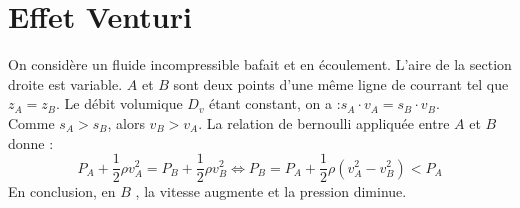 \section{Effet Venturi}


On considère un fluide incompressible bafait et en écoulement. L'aire de la section droite est variable. \( A\) et \(B\) sont deux points d'une même ligne de courrant tel que \(z_{A} = z_{B}\). Le débit volumique \(D_{v}\) étant constant, on a :\(s_{A} \cdot v_{A} = s_{B} \cdot v_{B}\).\\
Comme \(s_{A}>s_{B}\), alors \(v_{B}>v_{A}\). La relation de bernoulli appliquée entre \(A\) et \(B\) donne : \\
\[
    P_{A} +\frac{1}{2}\rho v_{A}^{2} = P_{B} +\frac{1}{2}\rho v_{B}^{2} \iff P_{B} = P_{A} + \frac{1}{2}\rho (v_{A}^{2} - v_{B}^{2})<P_{A}
\]
En conclusion, en \(B\) , la vitesse augmente et la pression diminue.